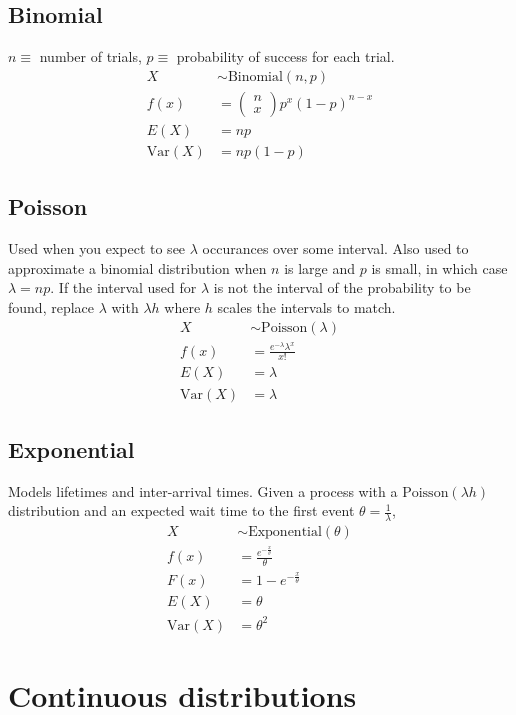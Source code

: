 \documentclass{article}
\newcommand{\var}{\text{Var}}
\newcommand{\binomial}{\text{Binomial}}
\newcommand{\poisson}{\text{Poisson}}
\newcommand{\exponential}{\text{Exponential}}
\begin{document}
\begin{multicols*}{2}
\subsection{Binomial}
$n \equiv$ number of trials, $p \equiv$ probability of success for each trial.
\begin{align*}
    X &\sim \binomial(n, p) \\
    f(x) &= \begin{pmatrix}
        n \\
        x
    \end{pmatrix} p^x (1-p)^{n-x} \\
    E(X) &= np \\
    \var(X) &= np(1-p)
\end{align*}

\subsection{Poisson}
Used when you expect to see $\lambda$ occurances over some interval. Also used to approximate a binomial distribution when $n$ is large and $p$ is small, in which case $\lambda = np$. If the interval used for $\lambda$ is not the interval of the probability to be found, replace $\lambda$ with $\lambda h$ where $h$ scales the intervals to match.
\begin{align*}
    X &\sim \poisson(\lambda) \\
    f(x) &= \frac{e^{-\lambda} \lambda^x}{x!} \\
    E(X) &= \lambda \\
    \var(X) &= \lambda
\end{align*}

\subsection{Exponential}
Models lifetimes and inter-arrival times. Given a process with a $\poisson(\lambda h)$ distribution and an expected wait time to the first event $\theta = \frac{1}{\lambda}$,
\begin{align*}
    X &\sim \exponential(\theta) \\
    f(x) &= \frac{e^{-\frac{x}{\theta}}}{\theta} \\
    F(x) &= 1 - e^{-\frac{x}{\theta}} \\
    E(X) &= \theta \\
    \var(X) &= \theta^2
\end{align*}

\section{Continuous distributions}


\end{multicols*}
\end{document}
